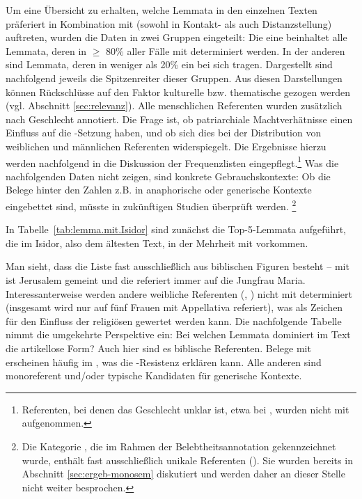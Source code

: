 Um eine Übersicht zu erhalten, welche Lemmata  in den einzelnen Texten präferiert in Kombination mit  (sowohl in Kontakt- als auch Distanzstellung) auftreten, wurden die Daten in zwei Gruppen eingeteilt: Die eine beinhaltet alle  Lemmata, deren  in $\geq$ 80\% aller Fälle  mit  determiniert werden. In der anderen sind  Lemmata, deren  in weniger als 20\%  ein  bei sich tragen. Dargestellt sind nachfolgend jeweils die Spitzenreiter dieser Gruppen. Aus diesen Darstellungen können Rückschlüsse auf den Faktor kulturelle bzw. thematische  gezogen werden (vgl. Abschnitt \ref{sec:relevanz}). Alle menschlichen Referenten wurden zusätzlich nach Geschlecht annotiert. Die Frage ist, ob patriarchiale Machtverhätnisse  einen Einfluss auf die -Setzung haben, und ob sich dies bei der Distribution von weiblichen und männlichen Referenten widerspiegelt. Die Ergebnisse hierzu werden nachfolgend in die Diskussion der Frequenzlisten eingepflegt.\footnote{Referenten, bei denen das Geschlecht unklar ist, etwa bei , wurden nicht mit aufgenommen.} Was die nachfolgenden Daten nicht zeigen, sind konkrete Gebrauchskontexte: Ob die Belege hinter den Zahlen z.B. in anaphorische  oder generische  Kontexte eingebettet sind, müsste in zukünftigen Studien überprüft werden. \footnote{Die Kategorie , die im Rahmen der Belebtheitsannotation gekennzeichnet wurde, enthält fast ausschließlich unikale Referenten (). Sie wurden bereits in Abschnitt \ref{sec:ergeb-monosem} diskutiert und werden daher an dieser Stelle nicht weiter besprochen.} 

In Tabelle~\ref {tab:lemma.mit.Isidor} sind zunächst die Top-5-Lemmata   aufgeführt, die im Isidor, also dem ältesten Text, in der Mehrheit mit  vorkommen. 


Man sieht, dass die Liste fast ausschließlich aus biblischen Figuren besteht -- mit  ist Jerusalem gemeint und die  referiert immer auf die Jungfrau Maria. Interessanterweise werden andere weibliche Referenten (, ) nicht mit  determiniert (insgesamt wird nur auf fünf Frauen mit Appellativa  referiert), was als Zeichen für den Einfluss der religiösen  gewertet werden kann. 
Die nachfolgende Tabelle nimmt die umgekehrte Perspektive ein: Bei welchen Lemmata  dominiert im Text die artikellose Form? Auch hier sind es biblische Referenten. Belege mit  erscheinen häufig im , was die -Resistenz erklären kann. Alle anderen sind monoreferent und/oder typische Kandidaten für generische  Kontexte.

